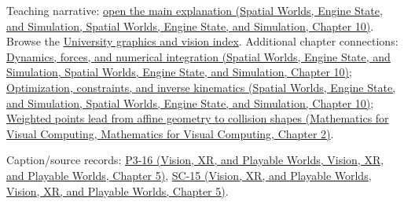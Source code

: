 Teaching narrative: \href{../05-Spatial-Worlds-Engine-State-and-Simulation/main.pdf\#nameddest=04-visual-computing-ii-ch029-dynamics-forces-and-numerical-integration}{open the main explanation (Spatial Worlds, Engine State, and Simulation, Spatial Worlds, Engine State, and Simulation, Chapter 10)}. Browse the \hyperref[appendix-a6d556a4ef50-university-graphics-vision-and-photography---independent-series]{University graphics and vision index}. Additional chapter connections: \href{../05-Spatial-Worlds-Engine-State-and-Simulation/main.pdf\#nameddest=04-visual-computing-ii-ch029-dynamics-forces-and-numerical-integration}{Dynamics, forces, and numerical integration (Spatial Worlds, Engine State, and Simulation, Spatial Worlds, Engine State, and Simulation, Chapter 10)}; \href{../05-Spatial-Worlds-Engine-State-and-Simulation/main.pdf\#nameddest=04-visual-computing-ii-ch029-optimization-constraints-and-inverse-kinematics}{Optimization, constraints, and inverse kinematics (Spatial Worlds, Engine State, and Simulation, Spatial Worlds, Engine State, and Simulation, Chapter 10)}; \href{../02-Mathematics-for-Visual-Computing/main.pdf\#nameddest=01-foundations-i-ch018-weighted-points-lead-from-affine-geometry-to-collision-shapes}{Weighted points lead from affine geometry to collision shapes (Mathematics for Visual Computing, Mathematics for Visual Computing, Chapter 2)}.

Caption/source records: \href{../07-Vision-XR-and-Playable-Worlds/main.pdf\#nameddest=04-visual-computing-ii-ch036-p3-16---subdivision-surfaces-part-1}{P3-16 (Vision, XR, and Playable Worlds, Vision, XR, and Playable Worlds, Chapter 5)}, \href{../07-Vision-XR-and-Playable-Worlds/main.pdf\#nameddest=04-visual-computing-ii-ch036-sc-15---stanford-cs231n-deep-learning-for-computer-vision-spring-2025-lecture-15-3d-vision}{SC-15 (Vision, XR, and Playable Worlds, Vision, XR, and Playable Worlds, Chapter 5)}.
